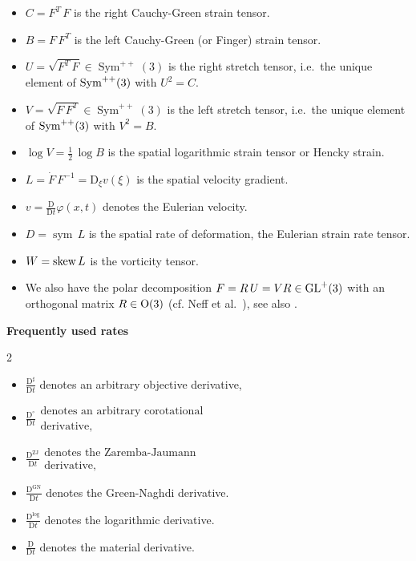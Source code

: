 \documentclass[10pt]{article}
\numberwithin{theoremCounter}{section}
\theoremstyle{plain}
\theoremstyle{definition}
\newcommand{\OO}{{\rm O}}
\newcommand{\DD}{\mathrm{D}}
\DeclareMathOperator{\Sym}{Sym}
\DeclareMathOperator{\sym}{sym}
\DeclareMathOperator{\ZJ}{ZJ}
\DeclareMathOperator{\GN}{GN}
\def\sk{\textnormal{skew}}
\def\dd{\displaystyle}
\numberwithin{equation}{section}
\begin{document}
\begin{appendix}
\begin{itemize}
	\item $C=F^T \, F$ is the right Cauchy-Green strain tensor.
	\item $B=F\, F^T$ is the left Cauchy-Green (or Finger) strain tensor.
	\item $U = \sqrt{F^T \, F} \in \Sym^{++}(3)$ is the right stretch tensor, i.e.~the unique element of ${\rm Sym}^{++}(3)$ with $U^2=C$.
	\item $V = \sqrt{F \, F^T} \in \Sym^{++}(3)$ is the left stretch tensor, i.e.~the unique element of ${\rm Sym}^{++}(3)$ with $V^2=B$.
	\item $\log V = \frac12 \, \log B$ is the spatial logarithmic strain tensor or Hencky strain.
	\item $L = \dot F \, F^{-1} = \DD_\xi v(\xi)$ is the spatial velocity gradient.
	\item $v = \frac{\DD}{\DD t} \varphi(x, t)$ denotes the Eulerian velocity.
	\item $D = \sym \, L$ is the spatial rate of deformation, the Eulerian strain rate tensor.
	\item $W = \sk \, L$ is the vorticity tensor.
	\item We also have the polar decomposition $F = R \, U = V R \in {\rm GL}^+(3)$ with an orthogonal matrix $R \in \OO(3)$ (cf. Neff et al.~\cite{Neffpolardecomp}), see also \cite{LankeitNeffNakatsukasa,Neff_Nagatsukasa_logpolar13}.
	\end{itemize}
%
\noindent \textbf{Frequently used rates}
	\begin{multicols}{2}
	\begin{itemize}
	\item $\dd \frac{\DD^{\sharp}}{\DD t}$ denotes an arbitrary objective derivative,
	\item $\dd \frac{\DD^{\circ}}{\DD t} \begin{array}{l} \text{denotes an arbitrary corotational} \\ \text{derivative,} \end{array}$
	\item $\dd \frac{\DD^{\ZJ}}{\DD t} \begin{array}{l} \text{denotes the Zaremba-Jaumann} \\ \text{derivative,} \end{array}$
	\item $\dd \frac{\DD^{\GN}}{\DD t}$ denotes the Green-Naghdi derivative.
	\item $\dd \frac{\DD^{\log}}{\DD t}$ denotes the logarithmic derivative.
	\item $\dd \frac{\DD}{\DD t}$ denotes the material derivative.

\end{itemize}
\end{multicols}
\end{appendix}
\end{document}
